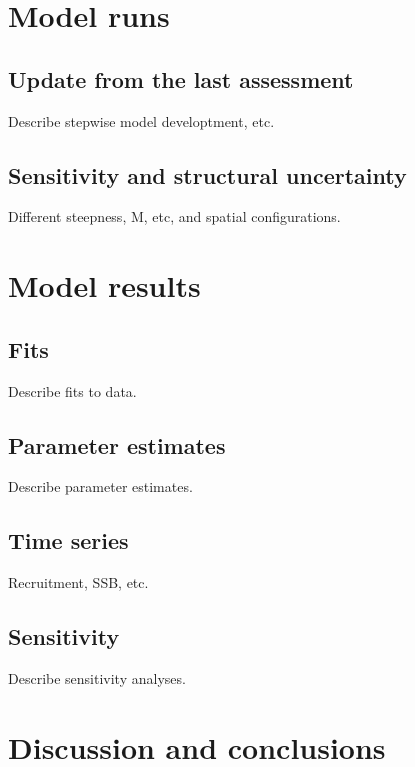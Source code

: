 \documentclass[
]{scrartcl}
\begin{document}
\section{Model runs}\label{model-runs}

\subsection{Update from the last
assessment}\label{update-from-the-last-assessment}

Describe stepwise model developtment, etc.

\subsection{Sensitivity and structural
uncertainty}\label{sensitivity-and-structural-uncertainty}

Different steepness, M, etc, and spatial configurations.

\section{Model results}\label{model-results}

\subsection{Fits}\label{fits}

Describe fits to data.

\subsection{Parameter estimates}\label{parameter-estimates}

Describe parameter estimates.

\subsection{Time series}\label{time-series}

Recruitment, SSB, etc.

\subsection{Sensitivity}\label{sensitivity}

Describe sensitivity analyses.

\section{Discussion and conclusions}\label{discussion-and-conclusions}
\end{document}
